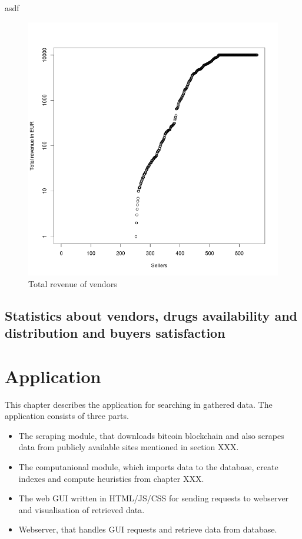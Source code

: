 \documentclass[
  digital, %
  table,   %
  lof,     %
  lot,     %
  oneside
]{fithesis3}
\begin{document}
asdf
\begin{figure}[!htb]
    \centering
    \includegraphics[scale=0.4]{total-rev}
    \caption{Total revenue of vendors}
    \label{Vendors by total revenue}
\end{figure}

\section{Statistics about vendors, drugs availability and distribution and buyers satisfaction}

\chapter{Application}

This chapter describes the application for searching in gathered data.
The application consists of three parts.

\begin{itemize}
 \item The scraping module, that downloads bitcoin blockchain and also scrapes data from publicly available sites mentioned in section XXX.
 \item The computanional module, which imports data to the database, create indexes and compute heuristics from chapter XXX.
 \item The web GUI written in HTML/JS/CSS for sending requests to webserver and visualisation of retrieved data. 
 \item Webserver, that handles GUI requests and retrieve data from database.
\end{itemize}
\end{document}
